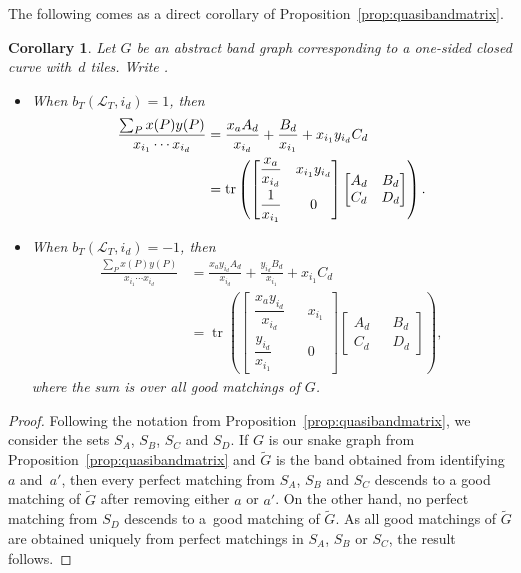 \documentclass[10pt,a4paper]{amsart}
\numberwithin{equation}{section}
\newtheorem{Corollary}[Theorem]{Corollary}
\theoremstyle{definition}
\begin{document}
The following comes as a direct corollary of Proposition~\ref{prop:quasibandmatrix}.

\begin{Corollary}\label{cor:matrixformula}
Let $G$ be an abstract band graph corresponding to a one-sided closed curve with~$d$ tiles. Write .
\begin{itemize}\itemsep=0pt
\item When $b_T({\mathcal{L}_T}, i_d)=1$, then
\begin{align}
\frac{\sum_P x(P)y(P)}{x_{i_1}\cdots x_{i_d}}&=\frac{x_a A_d}{x_{i_d}}+\frac{B_d}{x_{i_1}}+x_{i_1}y_{i_d}C_d\nonumber\\
&=\operatorname{tr}\left(\begin{bmatrix}
\dfrac{x_a}{x_{i_d}} & x_{i_1}y_{i_d}\vspace{1mm}\\
\dfrac{1}{x_{i_1}} & 0
\end{bmatrix}
\begin{bmatrix}
A_d & B_d\\
C_d & D_d
\end{bmatrix}\right).\label{eqn:matrixformula1+}
\end{align}

\item When $b_T({\mathcal{L}_T}, i_d)=-1$, then
\begin{align}
\frac{\sum_P x(P)y(P)}{x_{i_1}\cdots x_{i_d}}&=\frac{x_ay_{i_d} A_d}{x_{i_d}}+\frac{y_{i_d}B_d}{x_{i_1}}+x_{i_1}C_d\nonumber\\
&=\operatorname{tr}\left(\begin{bmatrix}
\dfrac{x_ay_{i_d}}{x_{i_d}} && x_{i_1}\\
\dfrac{y_{i_d}}{x_{i_1}} && 0
\end{bmatrix}
\begin{bmatrix}
A_d && B_d\\
C_d && D_d
\end{bmatrix}\right), \label{eqn:matrixformula2+}
\end{align}
where the sum is over all good matchings of $G$.
\end{itemize}
\end{Corollary}
\begin{proof}
Following the notation from Proposition~\ref{prop:quasibandmatrix}, we consider the sets $S_A$, $S_B$, $S_C$ and $S_D$. If $G$ is our snake graph from Proposition~\ref{prop:quasibandmatrix} and $\widetilde{G}$ is the band obtained from identifying $a$ and~$a'$, then every perfect matching from $S_A$, $S_B$ and $S_C$ descends to a good matching of $\widetilde{G}$ after removing either $a$ or $a'$. On the other hand, no perfect matching from $S_D$ descends to a~good matching of $\widetilde{G}$. As all good matchings of $\widetilde{G}$ are obtained uniquely from perfect matchings in $S_A$, $S_B$ or $S_C$, the result follows.
\end{proof}
\end{document}
